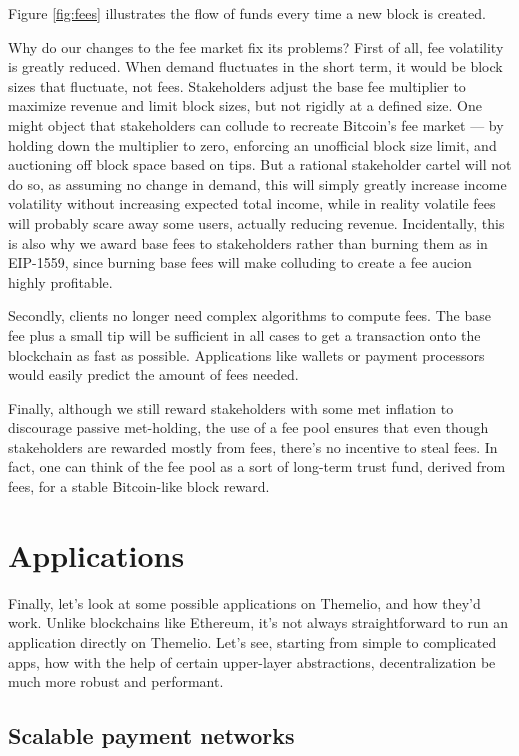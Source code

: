 \documentclass[headinclude]{scrbook}
\begin{document}
Figure \ref{fig:fees} illustrates the flow of funds every time a new block is created. 

Why do our changes to the fee market fix its problems? First of all, fee volatility is greatly reduced. When demand fluctuates in the short term, it would be block sizes that fluctuate, not fees. Stakeholders adjust the base fee multiplier to maximize revenue and limit block sizes, but not rigidly at a defined size. One might object that stakeholders can collude to recreate Bitcoin's fee market --- by holding down the multiplier to zero, enforcing an unofficial block size limit, and auctioning off block space based on tips. But a rational stakeholder cartel will not do so, as assuming no change in demand, this will simply greatly increase income volatility without increasing expected total income, while in reality volatile fees will probably scare away some users, actually reducing revenue. Incidentally, this is also why we award base fees to stakeholders rather than burning them as in EIP-1559, since burning base fees will make colluding to create a fee aucion highly profitable.

Secondly, clients no longer need complex algorithms to compute fees. The base fee plus a small tip will be sufficient in all cases to get a transaction onto the blockchain as fast as possible. Applications like wallets or payment processors would easily predict the amount of fees needed.

Finally, although we still reward stakeholders with some met inflation to discourage passive met-holding, the use of a fee pool ensures that even though stakeholders are rewarded mostly from fees, there's no incentive to steal fees. In fact, one can think of the fee pool as a sort of long-term trust fund, derived from fees, for a stable Bitcoin-like block reward. 

\chapter{Applications}

Finally, let's look at some possible applications on Themelio, and how they'd work. Unlike blockchains like Ethereum, it's not always straightforward to run an application directly on Themelio. Let's see, starting from simple to complicated apps, how with the help of certain upper-layer abstractions, decentralization be much more robust and performant.

\section{Scalable payment networks}
\end{document}
